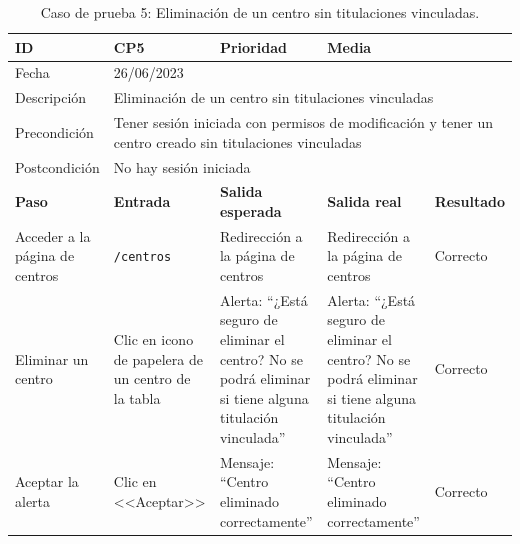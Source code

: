 \begin{table}[H]
\small
\begin{tabular}{p{} p{} p{} p{} p{}}
\cellcolor{gray!25}
ID   & CP5 & \cellcolor{gray!25} Prioridad   & Media \\ \hline
\cellcolor{gray!25} Fecha	&	\multicolumn{4}{l}{26/06/2023} \\ \hline
\cellcolor{gray!25} Descripción		&	\multicolumn{4}{l}{Eliminación de un centro sin titulaciones vinculadas} \\ \hline                                            
\cellcolor{gray!25}
Precondición  & \multicolumn{4}{p{.66\textwidth}}{Tener sesión iniciada con permisos de modificación y tener un centro creado sin titulaciones vinculadas} \\ \hline
\cellcolor{gray!25} Postcondición & \multicolumn{4}{l}{No hay sesión iniciada}                                                    \\ \hline
\rowcolor{gray!25}
\textbf{Paso}   & \textbf{Entrada} & \textbf{Salida esperada} & \textbf{Salida real} & \textbf{Resultado} \\ \hline
Acceder a la página de centros 
& \texttt{/centros}                                                                             
& Redirección a la página de centros                                   
& Redirección a la página de centros                                   
& Correcto                            
\\ \hline
Eliminar un centro
& Clic en icono de papelera de un centro de la tabla
& Alerta: ``¿Está seguro de eliminar el centro? No se podrá eliminar si tiene alguna titulación vinculada''
& Alerta: ``¿Está seguro de eliminar el centro? No se podrá eliminar si tiene alguna titulación vinculada''                              
& Correcto
\\ \hline
Aceptar la alerta
& Clic en <<Aceptar>>
& Mensaje: ``Centro eliminado correctamente''                              
& Mensaje: ``Centro eliminado correctamente''                             
& Correcto                            
\\ \hline                
\end{tabular}
\caption{Caso de prueba 5: Eliminación de un centro sin titulaciones vinculadas.}\label{table:CP5}
\end{table}

